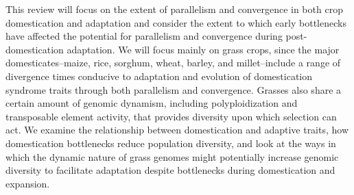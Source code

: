 \documentclass[12pt]{article}
\begin{document}
This review will focus on the extent of parallelism and convergence in both crop domestication and adaptation and consider the extent to which early bottlenecks have affected the potential for parallelism and convergence during post-domestication adaptation.
We will focus mainly on grass crops, since the major domesticates--maize, rice, sorghum, wheat, barley, and millet--include a range of divergence times conducive to adaptation and evolution of domestication syndrome traits through both parallelism and convergence.
Grasses also share a certain amount of genomic dynamism, including polyploidization and transposable element activity, that provides diversity upon which selection can act.
We examine the relationship between domestication and adaptive traits, how domestication bottlenecks reduce population diversity, and look at the ways in which the dynamic nature of grass genomes might potentially increase genomic diversity to facilitate adaptation despite bottlenecks during domestication and expansion.
\paragraph{}
\end{document}
